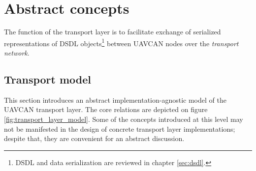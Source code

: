\section{Abstract concepts}

The function of the transport layer is to facilitate exchange of serialized representations of DSDL objects\footnote{%
    DSDL and data serialization are reviewed in chapter \ref{sec:dsdl}.
} between UAVCAN nodes over the \emph{transport network}.

\subsection{Transport model}\label{sec:transport_model}

This section introduces an abstract implementation-agnostic model of the UAVCAN transport layer.
The core relations are depicted on figure \ref{fig:transport_layer_model}.
Some of the concepts introduced at this level may not be manifested in the design of concrete transport layer
implementations; despite that, they are convenient for an abstract discussion.

